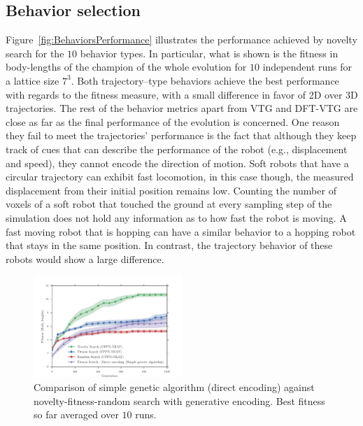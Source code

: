 \documentclass{sig-alternate}
\begin{document}
\subsection{Behavior selection} 

Figure~\ref{fig:BehaviorsPerformance} illustrates the performance achieved by novelty search for the $10$ behavior types. In particular, what is shown is the fitness in body-lengths of the champion of the whole evolution for $10$ independent runs for a lattice size $7^3$. Both trajectory--type behaviors achieve the best performance with regards to the fitness measure, with a small difference in favor of 2D over 3D trajectories. The rest of the behavior metrics apart from VTG and DFT-VTG are close as far as the final performance of the evolution is concerned. One reason they fail to meet the trajectories' performance is the fact that although they keep track of cues that can describe the performance of the robot (e.g., displacement and speed), they cannot encode the direction of motion. Soft robots that have a circular trajectory can exhibit fast locomotion, in this case though, the measured displacement from their initial position remains low. Counting the number of voxels of a soft robot that touched the ground at every sampling step of the simulation does not hold any information as to how fast the robot is moving. A fast moving robot that is hopping can have a similar behavior to a hopping robot that stays in the same position. In contrast, the trajectory behavior of these robots would show a large difference.


\begin{figure}[b!]
\centering
\includegraphics[width=0.5\textwidth]{../Figures/Results/FitNovRandomDirectSize5.pdf}
\caption{Comparison of simple genetic algorithm (direct encoding) against novelty-fitness-random search with generative encoding. Best fitness so far averaged over $10$ runs.}
\label{fig:FitNovRandomDirectSize5}
\end{figure}
\end{document}
